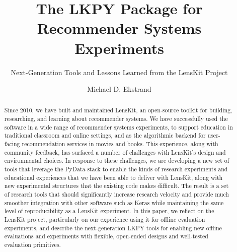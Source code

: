 \documentclass[sigconf]{acmart}
\begin{document}
\title{The LKPY Package for  Recommender Systems Experiments}
\subtitle{Next-Generation Tools and Lessons Learned from the LensKit Project}

\author{Michael D. Ekstrand}


\begin{abstract}
Since 2010, we have built and maintained LensKit, an open-source toolkit for building, researching, and learning about recommender systems.
We have successfully used the software in a wide range of recommender systems experiments, to support education in traditional classroom and online settings, and as the algorithmic backend for user-facing recommendation services in movies and books.
This experience, along with community feedback, has surfaced a number of challenges with LensKit's design and environmental choices.
In response to these challenges, we are developing a new set of tools that leverage the PyData stack to enable the kinds of research experiments and educational experiences that we have been able to deliver with LensKit, along with new experimental structures that the existing code makes difficult.
The result is a set of research tools that should significantly increase research velocity and provide much smoother integration with other software such as Keras while maintaining the same level of reproducibility as a LensKit experiment.
In this paper, we reflect on the LensKit project, particularly on our experience using it for offline evaluation experiments, and describe the next-generation LKPY tools for enabling new offline evaluations and experiments with flexible, open-ended designs and well-tested evaluation primitives.
\end{abstract}

%
%
\end{document}
